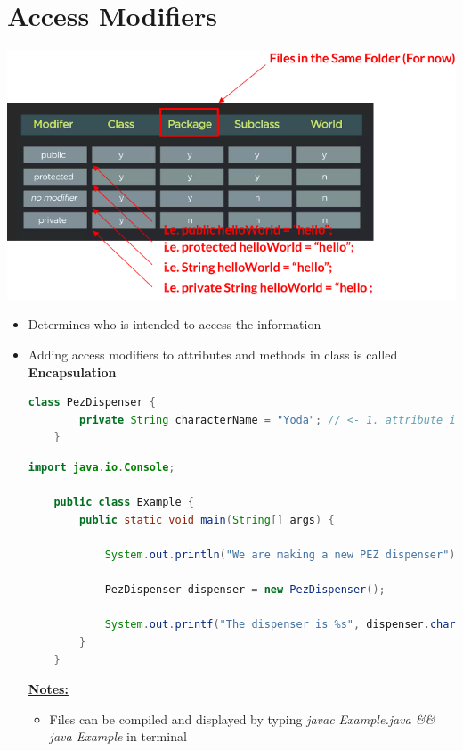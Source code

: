 \documentclass[12pt]{article}
\begin{document}
\bigskip

\section{Access Modifiers}

\bigskip

\begin{center}
\includegraphics[width=\linewidth]{images/part_1_notes_1.png}
\end{center}

\begin{itemize}
    \item Determines who is intended to access the information
    \item Adding access modifiers to attributes and methods in class is called
    \textbf{Encapsulation}

    \begin{lstlisting}[language=Java,caption={lesson\_5/PezDispenser.java}]
    class PezDispenser {
        private String characterName = "Yoda"; // <- 1. attribute is turned private
    }
    \end{lstlisting}

    \bigskip

    \begin{lstlisting}[language=Java,caption={lesson\_5/Example.java}]
    import java.io.Console;

    public class Example {
        public static void main(String[] args) {

            System.out.println("We are making a new PEZ dispenser");

            PezDispenser dispenser = new PezDispenser();

            System.out.printf("The dispenser is %s", dispenser.characterName); // <- 2. and it can't be accessed outside of class
        }
    }
    \end{lstlisting}

    \bigskip

    \underline{\textbf{Notes:}}

    \bigskip

    \begin{itemize}
        \item Files can be compiled and displayed by typing \textit{javac Example.java \&\& java Example}
        in terminal
    \end{itemize}
\end{itemize}
\end{document}
